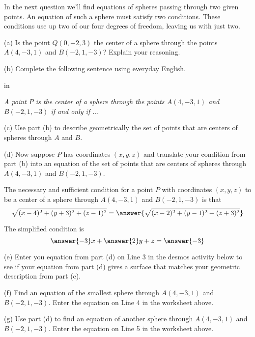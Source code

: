 \documentclass{ximera}
\newcommand{\pskip}{\vskip 0.1 in}
\begin{document}
In the next question we'll find equations of spheres passing through two given points. An equation of such a sphere must satisfy two conditions. These conditions use up two of our four degrees of freedom, leaving us with just two.  

\begin{question}   \label{Q5453466366}
\begin{freeResponse}
(a) Is the point $Q(0,-2,3)$ the center of a sphere through the points $A(4,-3,1)$ and $B(-2,1,-3)$? Explain your reasoning.

(b) Complete the following sentence using everyday English.

\pskip

\emph{A point $P$ is the center of a sphere through the points $A(4,-3,1)$ and $B(-2,1,-3)$ if and only if ...}

(c) Use part (b) to describe geometrically the set of points that are centers of spheres through $A$ and $B$.

\end{freeResponse}

(d) Now suppose $P$ has coordinates $(x,y,z)$ and translate your condition from part (b) into an equation of the set of points that are centers of spheres through $A(4,-3,1)$ and $B(-2,1,-3)$. 

The necessary and sufficient condition for a point $P$ with coordinates $(x,y,z)$ to be a center of a sphere through $A(4,-3,1)$ and $B(-2,1,-3)$ is that
\[
     \sqrt{(x-4)^2 + (y+3)^2 + (z-1)^2} = \answer{ \sqrt{(x-2)^2 + (y-1)^2 + (z+3)^2}}
\]

The simplified condition is 
\[
       \answer{-3}x + \answer{2}y + z = \answer{-3}
\]

(e) Enter you equation from part (d) on Line 3 in the desmos activity below to see if your equation from part (d) gives a surface that matches your geometric description from part (c).


\begin{onlineOnly}
    \begin{center}
\end{center}
\end{onlineOnly}


(f) Find an equation of the smallest sphere through $A(4,-3,1)$ and $B(-2,1,-3)$. Enter the equation on Line 4 in the worksheet above.

(g) Use part (d) to find an equation of another sphere through $A(4,-3,1)$ and $B(-2,1,-3)$. Enter the equation on Line 5 in the worksheet above.

\end{question}
\end{document}
